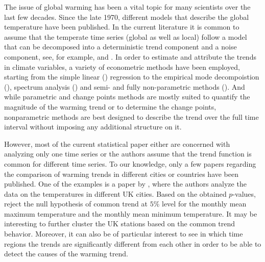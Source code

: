 \documentclass[a4paper,12pt]{article}
\begin{document}
\begin{example}
The issue of global warming has been a vital topic for many scientists over the last few decades. Since the late 1970, different models that describe the global temperature have been published. In the current literature it is common to assume that the temperate time series (global as well as local) follow a model that can be decomposed into a deterministic trend component and a noise component, see, for example, \cite{Ghil1991} and \cite{Mudelsee2018}. In order to estimate and attribute the trends in climate variables, a variety of econometric methods have been employed, starting from the simple linear (\cite{Yue2013}) regression to the empirical mode decompoistion (\cite{Wu2011}), spectrum analysis (\cite{Ghil1991}) and semi- and fully non-parametric methods (\cite{Gao2006}). And while parametric and change points methods are mostly suited to quantify the magnitude of the warming trend or to determine the change points, nonparametric methods are best designed to describe the trend over the full time interval without imposing any additional structure on it.

However, most of the current statistical paper either are concerned with analyzing only one time series or the authors assume that the trend function is common for different time series. To our knowledge, only a few papers regarding the comparison of warming trends in different cities or countries have been published. One of the examples is a paper by \cite{Zhang2012}, where the authors analyze the data on the temperatures in different UK cities. Based on the obtained $p$-values, \cite{Zhang2012} reject the null hypothesis of common trend at $5\%$ level for the monthly mean maximum temperature and the monthly mean minimum temperature. It may be interesting to further cluster the UK stations based on the common trend behavior. Moreover, it can also be of particular interest to see in which time regions the trends are significantly different from each other in order to be able to detect the causes of the warming trend.



\end{example}
\end{document}
